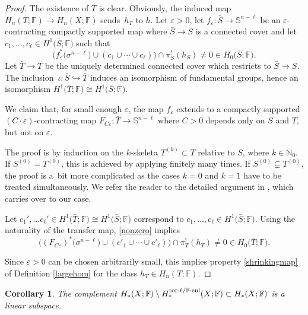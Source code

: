 \documentclass[10pt,a4paper]{amsart}
\numberwithin{equation}{section}
\newtheorem{Corollary}[Theorem]{Corollary}
\newcommand{\F}{\mathbb{F}}
\newcommand{\N}{\mathbb{N}}
\newcommand{\SSS}{\mathbb{S}}
\newcommand{\eps}{\varepsilon}
\begin{document}
\begin{proof} The existence of $T$ is clear.
Obviously, the induced map $H_n(T; \F) \to H_n(X; \F)$ sends~$h_T$ to $h$.
Let $\eps > 0$, let $f_{\eps} \colon \bar S \to \SSS^{n-\ell}$ be an $\eps$-contracting compactly supported map where $\bar S \to S$ is a connected cover and let $c_1, \ldots, c_\ell \in H^1\big(\bar S; \F\big)$ such that
\begin{equation} \label{nonzero}
 \big( f_\eps^*\big(\sigma^{n-\ell}\big) \cup (c_1 \cup \cdots \cup c_\ell) \big) \cap \pi_S^!(h_S) \neq 0 \in H_{0}\big(\bar S; \F\big) .
\end{equation}
Let $\bar T \to T$ be the uniquely determined connected cover which restricts to $\bar S \to S$.
The inclusion~${\iota\colon \bar S \hookrightarrow \bar T}$ induces an isomorphism of fundamental groups, hence an isomorphism $H^1\big(\bar T; \F\big) \cong H^1\big(\bar S; \F\big)$.

We claim that, for small enough $\eps$, the map $f_\eps$ extends to a compactly supported $(C \cdot \eps)$-contracting map $F_{C\eps} \colon \bar T \to \SSS^{n-\ell}$ where $C > 0$ depends only on $S$ and $T$, but not on $\eps$.

The proof is by induction on the $k$-skeleta $T^{(k)} \subset T$ relative to $S$, where $k \in \N_0$.
If $S^{(0)} = T^{(0)}$, this is achieved by applying \cite[Lemma 3.2]{BH10} finitely many times.
If $S^{(0)} \subsetneq T^{(0)}$, the proof is a~bit more complicated as the cases $k=0$ and $k=1$ have to be treated simultaneously.
We refer the reader to the detailed argument in \cite[p.\ 474f.]{BH10}, which carries over to our case.

Let $c_1', \ldots c_\ell' \in H^1\big(\bar T; \F\big) \cong H^1\big(\bar S; \F\big)$ correspond to $c_1, \ldots, c_\ell \in H^1\big(\bar S; \F\big)$.
Using the naturality of the transfer map, \eqref{nonzero} implies
\begin{equation*}
 \big( (F_{C \eps})^*\big(\sigma^{n-\ell}\big) \cup (c'_1 \cup \cdots \cup c'_\ell) \big) \cap \pi_T^!(h_T) \neq 0 \in H_0\big(\bar T; \F\big).
\end{equation*}

Since $\eps > 0$ can be chosen arbitrarily small, this implies property \ref{shrinkingmap} of Definition \ref{largehom} for the class $h_T \in H_n(T; \F)$.
\end{proof}

\begin{Corollary} The complement $H_*(X ; \F) \setminus H_*^{\text{\rm tor-}\ell/\F\text{\rm -enl}}(X; \F) \subset H_*(X ; \F)$ is a linear subspace.
\end{Corollary}
\end{document}
